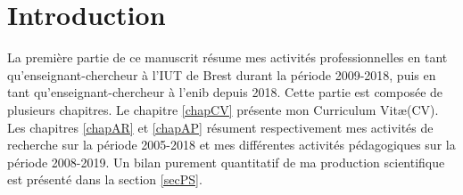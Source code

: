 
\chapter{Introduction}



La première partie de ce manuscrit résume mes activités professionnelles en tant qu'enseignant-chercheur à l'IUT de Brest durant la période 2009-2018, puis en tant qu'enseignant-chercheur à l'\gls{enib} depuis 2018. Cette partie est composée de plusieurs chapitres. Le chapitre \ref{chapCV} présente mon Curriculum Vit\ae (CV). Les chapitres \ref{chapAR} et \ref{chapAP} résument respectivement mes activités de recherche sur la période 2005-2018 et mes différentes activités pédagogiques sur la période 2008-2019. Un bilan purement quantitatif de ma production scientifique est présenté dans la section \ref{secPS}.

